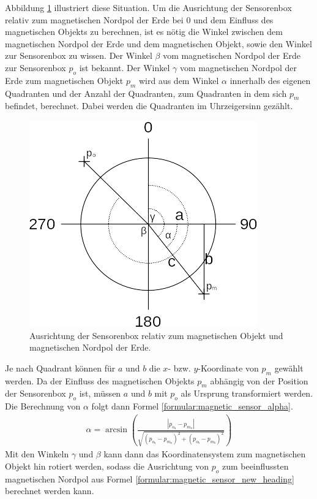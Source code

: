 Abbildung \ref{fig:magnetic_model} illustriert diese Situation.
Um die Ausrichtung der Sensorenbox relativ zum magnetischen Nordpol der Erde bei 0 und dem Einfluss des magnetischen Objekts zu berechnen,
ist es nötig die Winkel zwischen dem magnetischen Nordpol der Erde und dem magnetischen Objekt, sowie den Winkel zur Sensorenbox zu wissen.
Der Winkel $\beta$ vom magnetischen Nordpol der Erde zur Sensorenbox $p_{o}$ ist bekannt.
Der Winkel $\gamma$ vom magnetischen Nordpol der Erde zum magnetischen Objekt $p_{m}$ wird aus dem Winkel $\alpha$ innerhalb des eigenen Quadranten
und der Anzahl der Quadranten, zum Quadranten in dem sich $p_{m}$ befindet, berechnet.
Dabei werden die Quadranten im Uhrzeigersinn gezählt.
\begin{figure}[h!]
    \centering
    \includegraphics[width=0.7\linewidth]{images/magnetic_model.png}
    \caption{Ausrichtung der Sensorenbox relativ zum magnetischen Objekt und magnetischen Nordpol der Erde.}
    \label{fig:magnetic_model}
\end{figure}
Je nach Quadrant können für $a$ und $b$ die $x$- bzw. $y$-Koordinate von $p_{m}$ gewählt werden.
Da der Einfluss des magnetischen Objekts $p_{m}$ abhängig von der Position der Sensorenbox $p_{o}$ ist,
müssen $a$ und $b$ mit $p_{o}$ als Ursprung transformiert werden.
Die Berechnung von $\alpha$ folgt dann Formel \ref{formular:magnetic_sensor_alpha}.
\begin{align}
    \label{formular:magnetic_sensor_alpha}
    \alpha = \arcsin (\frac{|p_{o_a} - p_{m_a}|}{\sqrt{(p_{o_a} - p_{m_a})^2 + (p_{o_b} - p_{m_b})^2}})
\end{align}
Mit den Winkeln $\gamma$ und $\beta$ kann dann das Koordinatensystem zum magnetischen Objekt hin rotiert werden,
sodass die Ausrichtung von $p_{o}$ zum beeinflussten magnetischen Nordpol aus Formel \ref{formular:magnetic_sensor_new_heading} berechnet werden kann.
